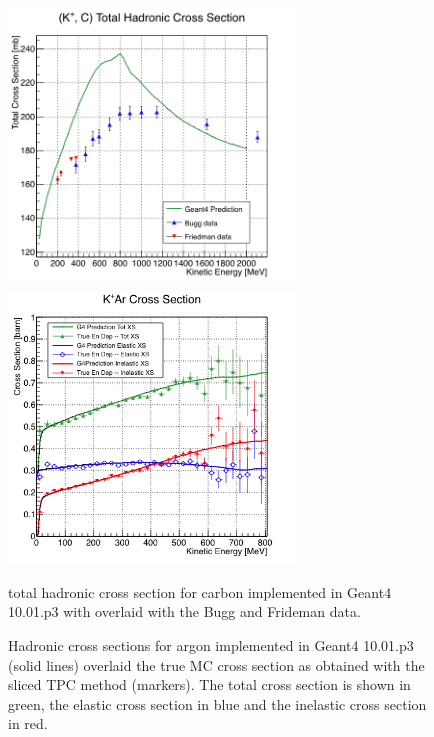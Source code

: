      
\begin{figure}
\captionsetup{justification=raggedright}  
\begin{minipage}[b]{.53\textwidth}  
  \centering  
\includegraphics[width=3in]{images/Lariat/CarbonG4.png}
\end{minipage}%
\begin{minipage}[b]{0.53\textwidth}  
  \centering  
\includegraphics[width=3in]{images/Lariat/KaonTrueXS.png}
\end{minipage}
\par
\begin{minipage}[t]{.53\textwidth}
\caption{total hadronic cross section for carbon implemented in Geant4  10.01.p3  with overlaid with the Bugg and Frideman data.}
\label{fig:TrueCarbon}
\end{minipage}%
\begin{minipage}[t]{.5\textwidth}  
\caption{Hadronic cross sections for argon implemented in Geant4 10.01.p3 (solid lines) overlaid the true MC cross section as obtained with the sliced TPC method (markers). The total cross section is shown in green,  the elastic cross section in blue and the inelastic cross section in red.}
\label{fig:TrueArgon}
\end{minipage}  
\end{figure}




